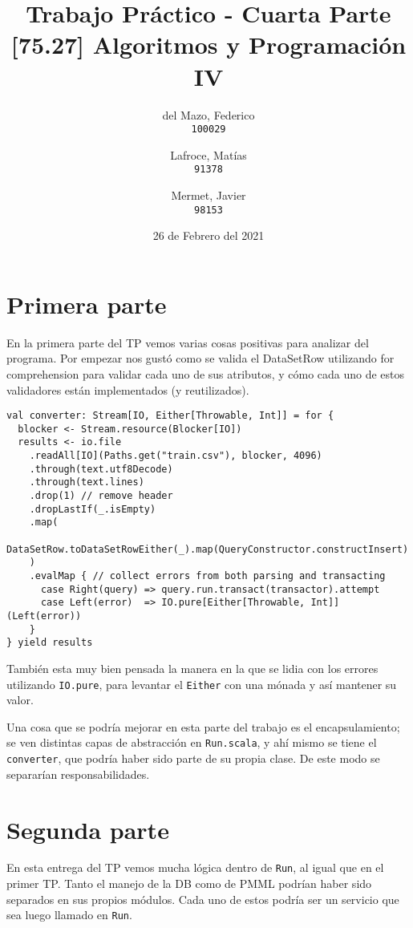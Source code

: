\documentclass{article}
\title{Trabajo Práctico - Cuarta Parte \\ \large{[75.27] Algoritmos y Programación IV}}
\author{
	del Mazo, Federico\\
	\texttt{100029}
	\and
	Lafroce, Matías\\
	\texttt{91378}\\
	\and
	Mermet, Javier\\
	\texttt{98153}
}
\date{26 de Febrero del 2021}
\begin{document}
\maketitle


\section{Primera parte}
En la primera parte del TP vemos varias cosas positivas para analizar del programa. Por empezar nos gustó como se valida el DataSetRow utilizando for comprehension para validar cada uno de sus atributos, y cómo cada uno de estos validadores están implementados (y reutilizados).

\begin{verbatim}
val converter: Stream[IO, Either[Throwable, Int]] = for {
  blocker <- Stream.resource(Blocker[IO])
  results <- io.file
    .readAll[IO](Paths.get("train.csv"), blocker, 4096)
    .through(text.utf8Decode)
    .through(text.lines)
    .drop(1) // remove header
    .dropLastIf(_.isEmpty)
    .map(
      DataSetRow.toDataSetRowEither(_).map(QueryConstructor.constructInsert)
    )
    .evalMap { // collect errors from both parsing and transacting
      case Right(query) => query.run.transact(transactor).attempt
      case Left(error)  => IO.pure[Either[Throwable, Int]](Left(error))
    }
} yield results
\end{verbatim}

También esta muy bien pensada la manera en la que se lidia con los errores utilizando \texttt{IO.pure}, para levantar el \texttt{Either} con una mónada y así mantener su valor.

Una cosa que se podría mejorar en esta parte del trabajo es el encapsulamiento; se ven distintas capas de abstracción en \texttt{Run.scala}, y ahí mismo se tiene el \texttt{converter}, que podría haber sido parte de su propia clase. De este modo se separarían responsabilidades.

\section{Segunda parte}
En esta entrega del TP vemos mucha lógica dentro de \texttt{Run}, al igual que en el primer TP. Tanto el manejo de la DB como de PMML podrían haber sido separados en sus propios módulos. Cada uno de estos podría ser un servicio que sea luego llamado en \texttt{Run}.
\end{document}
